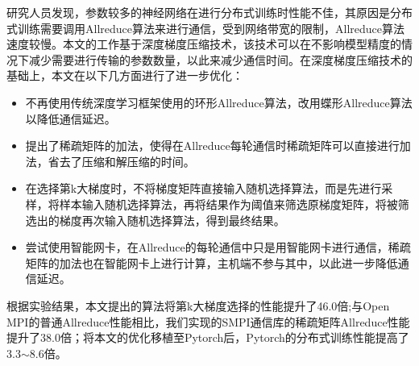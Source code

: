 \begin{cabstract}
  研究人员发现，参数较多的神经网络在进行分布式训练时性能不佳，其原因是分布式训练需要调用Allreduce算法来进行通信，受到网络带宽的限制，Allreduce算法速度较慢。本文的工作基于深度梯度压缩技术，该技术可以在不影响模型精度的情况下减少需要进行传输的参数数量，以此来减少通信时间。在深度梯度压缩技术的基础上，本文在以下几方面进行了进一步优化：
  \begin{itemize}
    \item 不再使用传统深度学习框架使用的环形Allreduce算法，改用蝶形Allreduce算法以降低通信延迟。
    \item 提出了稀疏矩阵的加法，使得在Allreduce每轮通信时稀疏矩阵可以直接进行加法，省去了压缩和解压缩的时间。
    \item 在选择第k大梯度时，不将梯度矩阵直接输入随机选择算法，而是先进行采样，将样本输入随机选择算法，再将结果作为阈值来筛选原梯度矩阵，将被筛选出的梯度再次输入随机选择算法，得到最终结果。
    \item 尝试使用智能网卡，在Allreduce的每轮通信中只是用智能网卡进行通信，稀疏矩阵的加法也在智能网卡上进行计算，主机端不参与其中，以此进一步降低通信延迟。
\end{itemize}

根据实验结果，本文提出的算法将第k大梯度选择的性能提升了46.0倍;与Open MPI的普通Allreduce性能相比，我们实现的SMPI通信库的稀疏矩阵Allreduce性能提升了38.0倍；将本文的优化移植至Pytorch后，Pytorch的分布式训练性能提高了3.3$\sim$8.6倍。
\end{cabstract}


